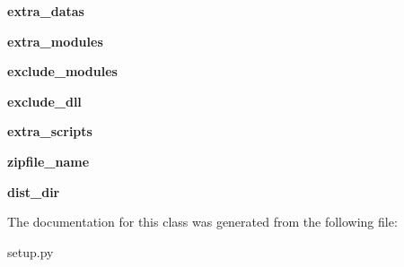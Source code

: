 \begin{DoxyCompactItemize}
\item 
\hypertarget{classsetup_1_1_build_exe_ae0edef04207e3b96a2de777b43e9ad26}{{\bfseries extra\-\_\-datas}}\label{classsetup_1_1_build_exe_ae0edef04207e3b96a2de777b43e9ad26}

\item 
\hypertarget{classsetup_1_1_build_exe_a7965e03505c7e76bfa1b66c83c6d7bcf}{{\bfseries extra\-\_\-modules}}\label{classsetup_1_1_build_exe_a7965e03505c7e76bfa1b66c83c6d7bcf}

\item 
\hypertarget{classsetup_1_1_build_exe_a62bd358704b560750febb9d4f6bf3d87}{{\bfseries exclude\-\_\-modules}}\label{classsetup_1_1_build_exe_a62bd358704b560750febb9d4f6bf3d87}

\item 
\hypertarget{classsetup_1_1_build_exe_a3661be6ceb0296d59220bc68282a5cdb}{{\bfseries exclude\-\_\-dll}}\label{classsetup_1_1_build_exe_a3661be6ceb0296d59220bc68282a5cdb}

\item 
\hypertarget{classsetup_1_1_build_exe_a911ce6dcda40696ee88b46f4d1191af6}{{\bfseries extra\-\_\-scripts}}\label{classsetup_1_1_build_exe_a911ce6dcda40696ee88b46f4d1191af6}

\item 
\hypertarget{classsetup_1_1_build_exe_a73205ec60073e573881979e1f030bc19}{{\bfseries zipfile\-\_\-name}}\label{classsetup_1_1_build_exe_a73205ec60073e573881979e1f030bc19}

\item 
\hypertarget{classsetup_1_1_build_exe_aa5d2ae97bca6ba75b0c70abeabede2d3}{{\bfseries dist\-\_\-dir}}\label{classsetup_1_1_build_exe_aa5d2ae97bca6ba75b0c70abeabede2d3}

\end{DoxyCompactItemize}


The documentation for this class was generated from the following file\-:\begin{DoxyCompactItemize}
\item 
setup.\-py\end{DoxyCompactItemize}

